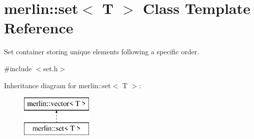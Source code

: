 \hypertarget{classmerlin_1_1set}{}\section{merlin\+:\+:set$<$ T $>$ Class Template Reference}
\label{classmerlin_1_1set}


Set container storing unique elements following a specific order.  




{\ttfamily \#include $<$set.\+h$>$}

Inheritance diagram for merlin\+:\+:set$<$ T $>$\+:\begin{figure}[H]
\begin{center}
\leavevmode
\includegraphics[height=2.000000cm]{classmerlin_1_1set}
\end{center}
\end{figure}
